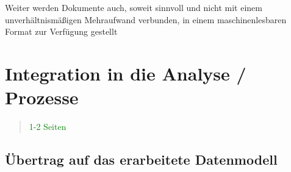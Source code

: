 Weiter werden Dokumente auch, soweit sinnvoll und nicht mit einem unverhältnismäßigen Mehraufwand verbunden, in einem maschinenlesbaren Format zur Verfügung gestellt \cite[Art. 8 Abs. 1f]{2011D0833}







        \pagebreak
    
    \section{Integration in die Analyse / Prozesse}
    
\begin{quote}
\textcolor{green}{1-2 Seiten}
\end{quote}

\subsection{Übertrag auf das erarbeitete Datenmodell}
\pagebreak